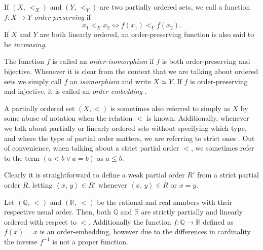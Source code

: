 \documentclass[../../main.tex]{subfiles}
\begin{document}
\begin{definition}\cite[p.13]{Jec78}
    If $\left(X,\, <_X\right)$ and $\left(Y,\, <_Y\right)$ are two partially ordered sets, we call a function $f: X \to Y$ \textit{order-preserving} if
    $$x_1 <_X x_2 \iff f(x_1) <_Y f(x_2).$$
    If $X$ and $Y$ are both linearly ordered, an order-preserving function is also said to be \textit{increasing}.

    The function $f$ is called an \textit{order-isomorphism} if $f$ is both order-preserving and bijective.
    Whenever it is clear from the context that we are talking about ordered sets we simply call $f$ an \textit{isomorphism} and write $X \simeq Y$.
    If $f$ is order-preserving and injective, it is called an \textit{order-embedding} \cite[p.167]{Gol17}.
\end{definition}

A partially ordered set $(X, <)$ is sometimes also referred to simply as $X$ by some abuse of notation when the relation $<$ is known.
Additionally, whenever we talk about partially or linearly ordered sets without specifying which type, and where the type of partial order matters, we are referring to strict ones \cite[p.12]{Jec78}.
Out of convenience, when talking about a strict partial order $<$, we sometimes refer to the term $\left(a < b \vee a = b\right)$ as $a \leq b$.

Clearly it is straightforward to define a weak partial order $R'$ from a strict partial order $R$, letting $\left<x,\, y\right> \in R'$ whenever $\left<x,\, y\right> \in R$ or $x = y$.

\begin{example}
        Let $(\mathbb{Q},\, <)$ and $(\mathbb{R},\, <)$ be the rational and real numbers with their respective usual order.
        Then, both $\mathbb{Q}$ and $\mathbb{R}$ are strictly partially and linearly ordered with respect to $<$.
        Additionally the function $f: \mathbb{Q} \to \mathbb{R}$ defined as $f(x) = x$ is an order-embedding, 
        however due to the differences in cardinality the inverse $f^{-1}$ is not a proper function.
\end{example}
\end{document}
